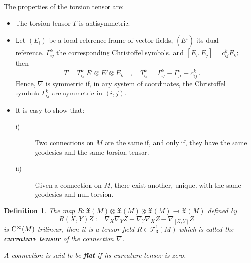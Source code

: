 \documentclass[12pt]{report}
\newtheorem{definition}[teor]{Definition}
\def\vf{\mathfrak X}
\def\Cinfty{{\rm C}^\infty}
\begin{document}
 The properties of the torsion tensor are:
\begin{itemize}
\item
The torsion tensor ${\mathit T}$ is antisymmetric.
 \item 
Let $(E_i)$ be a local reference frame of vector fields, $(E^i)$ its dual reference, 
$\Gamma_{ij}^k$ the corresponding Christoffel symbols,
and $[E_i,E_j]=c_{ij}^kE_k$; then
 $$
 {\mathit T}={\mathit T}_{ij}^k\, E^i\otimes E^j\otimes E_k \quad  , \quad 
{\mathit T}_{ij}^k=\Gamma_{ij}^k-\Gamma_{ji}^k-c_{ij}^k \ .
 $$ 
 Hence, $\nabla$ is symmetric if, in any system of coordinates,
the Christoffel symbols $\Gamma_{ij}^k$ are symmetric in $(i,j)$.
 \item 
It is easy to show that:
	\begin{description}
 \item[i)] 
Two connections on $M$ are the same if, and only if,
they have the same geodesics and the same torsion tensor.
  \item[ii)] 
Given a connection on $M$, there exist another, unique, 
with the same geodesics and null torsion. 
 \end{description} 
\end{itemize}

\begin{definition}
 The map ${\mathit R}\colon\vf(M)\otimes\vf(M)\otimes\vf(M)\to\vf(M)$ 
defined by
 $$
 {\mathit R}(X,Y)Z:=\nabla_X\nabla_Y Z-\nabla_Y\nabla_X Z-\nabla_{[X,Y]}Z 
 $$
 is $\Cinfty(M)$-trilinear, then it is a tensor field 
${\mathit R}\in{\mathcal T}_3^1(M)$ which is called 
the \textbf{curvature tensor} of the connection $\nabla$. 

A connection is said to be \textbf{flat} if its curvature tensor is zero.
\end{definition}
\end{document}
